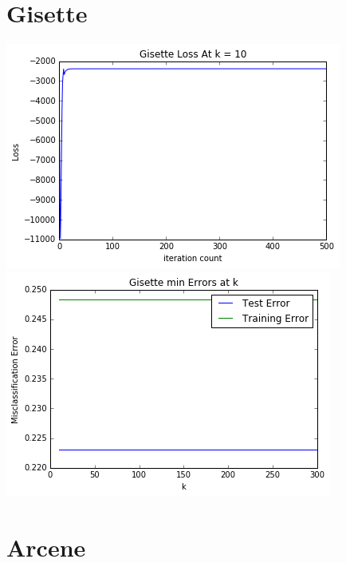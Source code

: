 \documentclass[letter]{article} %
\begin{document}
\setlength{\headsep}{0.5 in}

\section*{Gisette}

\includegraphics[scale=1]{gis_loss} \\
\includegraphics[scale=1]{gis_error}

\section*{Arcene}
\end{document}

